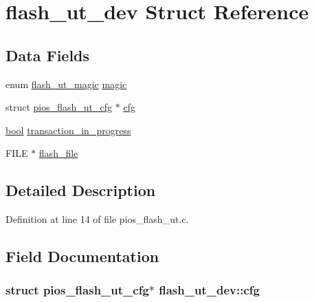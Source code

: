 \hypertarget{structflash__ut__dev}{\section{flash\-\_\-ut\-\_\-dev Struct Reference}
\label{structflash__ut__dev}
}
\subsection*{Data Fields}
\begin{DoxyCompactItemize}
\item 
enum \hyperlink{pios__flash__ut_8c_a9b498a69a687416b34b95a255083b7f6}{flash\-\_\-ut\-\_\-magic} \hyperlink{structflash__ut__dev_aefafb502345249d19bb9b82d91e1a4a7}{magic}
\item 
struct \hyperlink{structpios__flash__ut__cfg}{pios\-\_\-flash\-\_\-ut\-\_\-cfg} $\ast$ \hyperlink{structflash__ut__dev_a1bc1a8362c17b6cef6ca7d36dd3df8b7}{cfg}
\item 
\hyperlink{group___exported__types_gaf6a258d8f3ee5206d682d799316314b1}{bool} \hyperlink{structflash__ut__dev_a326284da380f2645162916c9bd58625b}{transaction\-\_\-in\-\_\-progress}
\item 
F\-I\-L\-E $\ast$ \hyperlink{structflash__ut__dev_ab7546f7aa05d2a2a0eb9ce54b9d4620a}{flash\-\_\-file}
\end{DoxyCompactItemize}


\subsection{Detailed Description}


Definition at line 14 of file pios\-\_\-flash\-\_\-ut.\-c.



\subsection{Field Documentation}
\hypertarget{structflash__ut__dev_a1bc1a8362c17b6cef6ca7d36dd3df8b7}{
\subsubsection[{cfg}]{\setlength{\rightskip}{0pt plus 5cm}struct {\bf pios\-\_\-flash\-\_\-ut\-\_\-cfg}$\ast$ flash\-\_\-ut\-\_\-dev\-::cfg}}\label{structflash__ut__dev_a1bc1a8362c17b6cef6ca7d36dd3df8b7}


